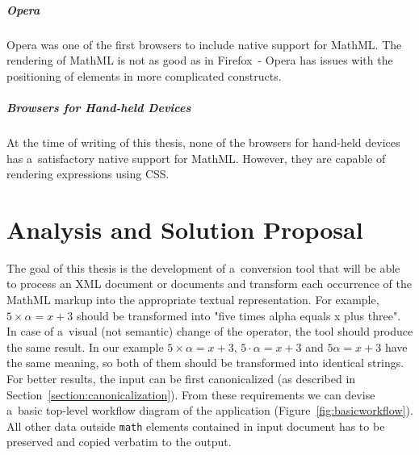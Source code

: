 \documentclass[11pt,oneside,final]{fithesis2}
\begin{document}
\paragraph*{Opera}
Opera was one of the first browsers to include native support for MathML. The rendering of MathML is not as good as in Firefox~- Opera has issues with the positioning of elements in more complicated constructs. 

\paragraph*{Browsers for Hand-held Devices}
At the time of writing of this thesis, none of the browsers for hand-held devices has a~satisfactory native support for MathML. However, they are capable of rendering expressions using CSS.


\chapter{Analysis and Solution Proposal}
\label{chapter:analysis}
The goal of this thesis is the development of a~conversion tool that will be able to process an XML document or documents and transform each occurrence of the MathML markup into the appropriate textual representation. For example, $5 \times \alpha = x + 3$ should be transformed into "five times alpha equals x plus three". In case of a~visual (not semantic) change of the operator, the tool should produce the same result. In our example $5 \times \alpha = x + 3$, $5 \cdot \alpha = x + 3$ and $5\alpha = x + 3$ have the same meaning, so both of them should be transformed into identical strings. For better results, the input can be first canonicalized (as described in Section~\ref{section:canonicalization}). From these requirements we can devise a~basic top-level workflow diagram of the application (Figure~\ref{fig:basicworkflow}). All other data outside \texttt{math} elements contained in input document has to be preserved and copied verbatim to the output.
\end{document}
